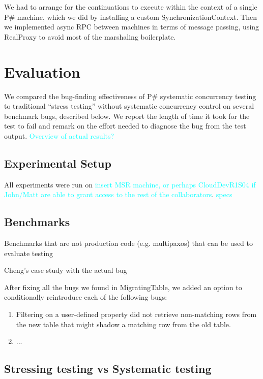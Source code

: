 \documentclass{sig-alternate}
\newcommand{\psharp}{P\#\xspace}
\newcommand{\Comment}[1]{\textcolor{cyan}{#1}}
\begin{document}
We had to arrange for the continuations to execute within the context of a single \psharp machine, which we did by installing a custom SynchronizationContext.  Then we implemented async RPC between machines in terms of message passing, using RealProxy to avoid most of the marshaling boilerplate.

\section{Evaluation}
\label{sec:eval}

We compared the bug-finding effectiveness of \psharp systematic concurrency testing to traditional ``stress testing'' without systematic concurrency control on several benchmark bugs, described below.  We report the length of time it took for the test to fail and remark on the effort needed to diagnose the bug from the test output. \Comment{Overview of actual results?}

\subsection{Experimental Setup}

All experiments were run on \Comment{insert MSR machine, or perhaps CloudDevR1S04 if John/Matt are able to grant access to the rest of the collaborators}. \Comment{specs}

\subsection{Benchmarks}

Benchmarks that are not production code (e.g. multipaxos) that can be used to evaluate testing

Cheng's case study with the actual bug

After fixing all the bugs we found in MigratingTable, we added an option to conditionally reintroduce each of the following bugs:
\begin{enumerate}
\item Filtering on a user-defined property did not retrieve non-matching rows from the new table that might shadow a matching row from the old table.
\item ...
\end{enumerate}

\subsection{Stressing testing vs Systematic testing}
\end{document}
